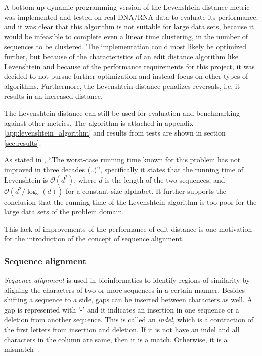 A bottom-up dynamic programming version of the Levenshtein distance metric was
implemented and tested on real DNA/RNA data to evaluate its performance, and it
was clear that this algorithm is not suitable for large data sets, because it
would be infeasible to complete even a linear time clustering, in the number of
sequences to be clustered. The implementation could most likely be optimized
further, but because of the characteristics of an edit distance algorithm like
Levenshtein and because of the performance requirements for this project, it
was decided to not pursue further optimization and instead focus on other types
of algorithms. Furthermore, the Levenshtein distance penalizes reversals, i.e.
it results in an increased distance.

The Levenshtein distance can still be used for evaluation and benchmarking
against other metrics. The algorithm is attached in appendix
\ref{app:levenshtein_algorithm} and results from tests are shown in section
\ref{sec:results}.

As stated in \cite[pp.~1-2]{andoni}, ``The worst-case running time known for
this problem has not improved in three decades (..)'', specifically it states
that the running time of Levenshtein is $\mathcal{O}(d^2)$, where $d$ is the
length of the two sequences, and $\mathcal{O}(d^2/\log_2(d))$ for a constant
size alphabet. It further supports the conclusion that the running time of the
Levenshtein algorithm is too poor for the large data sets of the problem
domain.

This lack of improvements of the performance of edit distance is one motivation
for the introduction of the concept of sequence alignment.



\subsubsection{Sequence alignment}

\emph{Sequence alignment} is used in bioinformatics to identify regions of
similarity by aligning the characters of two or more sequences in a certain
manner. Besides shifting a sequence to a side, gaps can be inserted between
characters as well. A gap is represented with '-' and it indicates an insertion
in one sequence or a deletion from another sequence. This is called an
\emph{indel}, which is a contraction of the first letters from insertion and
deletion. If it is not have an indel and all characters in the column are same,
then it is a match. Otherwise, it is a mismatch~\cite[pp.~135-136]{dong}.

